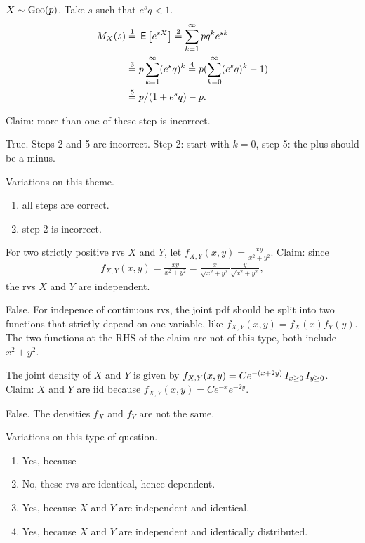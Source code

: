 \documentclass[tf-tutorial-all.tex]{subfiles}
\begin{document}
\begin{truefalse}
$X\sim \mathrm{Geo}(p)$. Take $s$ such that $e^{s}q < 1$.
\begin{align}
\label{eq:5}
M_{X}(s)
  &\stackrel{1}= \,\mathsf{E}\left[e^{sX}\right] \stackrel{2}= \sum_{k=1}^{\infty} p q^{k} e^{sk} \\
  &\stackrel{3}= p \sum_{k=1}^{\infty} (e^{s}q)^{k}
  \stackrel{4}= p (\sum_{k=0}^{\infty} (e^{s}q)^{k}-1) \\
&  \stackrel{5}= p /(1+e^{s}q)  - p.
\end{align}

Claim: more than one of these step is incorrect.
\begin{solution}
True. Steps 2 and 5 are incorrect. Step 2: start with $k=0$, step 5: the plus should be a minus.

Variations on this theme.
\begin{enumerate}
\item all steps are correct.
\item step 2 is incorrect.
\end{enumerate}
\end{solution}
\end{truefalse}


\begin{truefalse}
For two strictly positive rvs $X$ and $Y$, let $f_{X,Y}(x, y) = \frac{xy}{x^{2}+y^2}$. Claim: since
\begin{align*}
  f_{X,Y}(x, y) = \frac{xy}{x^{2}+y^2} = \frac{x}{\sqrt{x^{2}+y^2}} \frac{y}{\sqrt{x^{2}+y^2}},
\end{align*}
the rvs $X$ and $Y$ are independent.
\begin{solution}
False.
For indepence of continuous rvs, the joint pdf should be split into two functions that strictly depend on one variable, like $f_{X,Y}(x,y) = f_{X}(x) f_{Y}(y)$.
The two functions at the RHS of the claim are not of this type, both include $x^{2}+y^{2}$.
\end{solution}
\end{truefalse}


\begin{truefalse}
The joint density of $X$ and $Y$ is given by $f_{X,Y}(x,y) = Ce^{-(x + 2y)}\,I_{x\geq 0}\,I_{y\geq 0}$.
Claim:  $X$ and $Y$ are iid because  $f_{X,Y}(x, y) = C e^{-x}e^{-2y}$.
\begin{solution}
False. The densities  $f_{X}$ and $f_{Y}$ are not the same.

Variations on this type of question.
\begin{enumerate}
\item Yes, because
\item No,  these rvs are identical, hence dependent.
\item Yes, because $X$ and $Y$ are independent and identical.
\item Yes, because $X$ and $Y$ are independent and identically distributed.
\end{enumerate}
\end{solution}
\end{truefalse}
\end{document}
